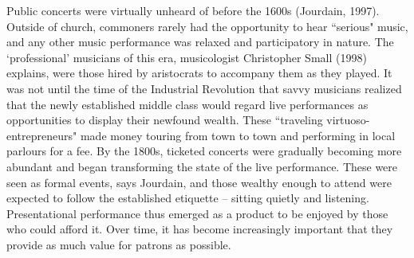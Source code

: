 Public concerts were virtually unheard of before the 1600s (Jourdain, 1997). Outside of church, commoners rarely had the opportunity to hear ``serious" music, and any other music performance was relaxed and participatory in nature. The `professional' musicians of this era, musicologist Christopher Small (1998) explains, were those hired by aristocrats to accompany them as they played. It was not until the time of the Industrial Revolution that savvy musicians realized that the newly established middle class would regard live performances as opportunities to display their newfound wealth. These ``traveling virtuoso-entrepreneurs" made money touring from town to town and performing in local parlours for a fee. By the 1800s, ticketed concerts were gradually becoming more abundant and began transforming the state of the live performance. These were seen as formal events, says Jourdain, and those wealthy enough to attend were expected to follow the established etiquette -- sitting quietly and listening. Presentational performance thus emerged as a product to be enjoyed by those who could afford it. Over time, it has become increasingly important that they provide as much value for patrons as possible.


